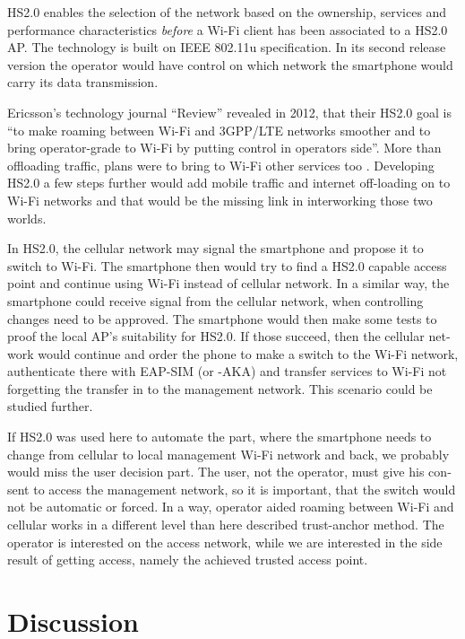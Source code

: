 \documentclass[12pt,a4paper,english]{tutthesis}
\begin{document}
\begin{otherlanguage}{english}
HS2.0
enables the selection of the network based on the ownership, services and
performance characteristics \emph{before} a Wi-Fi client has been associated
to a HS2.0 AP. The technology is built on IEEE 802.11u specification. 
In its second release version the operator would
have control on which network the smartphone would carry its data
transmission. 





Ericsson's technology journal ``Review'' revealed in 2012, that their 
HS2.0 goal is ``to make roaming between Wi-Fi and 3GPP/LTE networks smoother
and to bring operator-grade to Wi-Fi by putting control in operators side''. More
than offloading traffic, plans were to bring to Wi-Fi other services too \cite{er-seamless}.
Developing HS2.0 a few steps further would add mobile traffic and internet
off-loading on to Wi-Fi networks and that would be the missing link in
interworking those two worlds.



In HS2.0, the cellular network may signal the smartphone and
propose it to switch to Wi-Fi. The smartphone then would try to find a HS2.0 capable
access point and continue using Wi-Fi instead of cellular network.
In a similar way, the smartphone could receive signal from the cellular
network, when controlling changes need to be approved. The smartphone
would then make some tests to proof the local AP's suitability for 
HS2.0. If those succeed, then the cellular network would continue and order the 
phone to make a switch to the Wi-Fi network, authenticate there with 
EAP-SIM (or -AKA) and transfer services to Wi-Fi not forgetting 
the transfer in to the management network. This scenario could be 
studied further.


If HS2.0 was used here to automate the part, where
the smartphone needs to change from cellular to local
management Wi-Fi network and back, we probably would
miss the user decision part. The user, not the operator,
 must give his consent to access the management network, so
it is important, that the switch would not be automatic or forced.
In a way, operator aided roaming between Wi-Fi and cellular
works in a different level than here described trust-anchor method.
The operator is interested on the access network, while
we are interested in the side result of getting access, namely 
the achieved trusted access point.






\section{Discussion}
\label{sec-6-5}


\end{otherlanguage}
\end{document}
